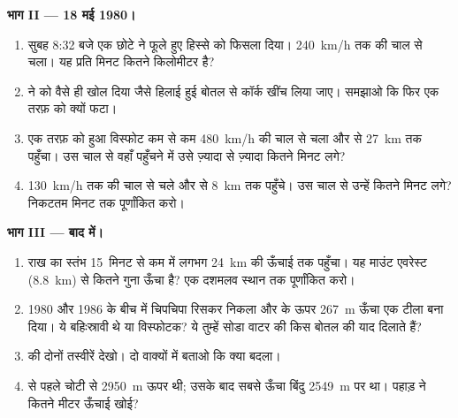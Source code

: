 \begin{problem}[{सप्ताहांत समस्या --- माउंट सेंट~हेलेंस के चेतावनी संकेत,
18~मई 1980 का उद्गार, और पहाड़ का कितना हिस्सा ग़ायब हो गया}]
\medskip
\noindent\textbf{भाग II --- 18 मई 1980।}\par\nopagebreak
\begin{enumerate}[resume, beginpenalty=10000]
  \item सुबह 8:32 बजे एक छोटे  ने फूले हुए हिस्से को फिसला दिया। 
        \qty{240}{km/h} तक की चाल से चला। यह प्रति मिनट कितने
        किलोमीटर है?
  \item {} ने  को वैसे ही खोल दिया जैसे हिलाई हुई बोतल से कॉर्क खींच
        लिया जाए। समझाओ कि फिर  एक तरफ़ को क्यों फटा।
  \item एक तरफ़ को हुआ विस्फोट कम से कम \qty{480}{km/h} की चाल से चला और
         से \qty{27}{km} तक पहुँचा। उस चाल से वहाँ पहुँचने में उसे
        ज़्यादा से ज़्यादा कितने मिनट लगे?
  \item {} \qty{130}{km/h} तक की चाल से चले और  से
        \qty{8}{km} तक पहुँचे। उस चाल से उन्हें कितने मिनट लगे? निकटतम मिनट तक
        पूर्णांकित करो।
\end{enumerate}

\medskip
\noindent\textbf{भाग III --- बाद में।}\par\nopagebreak
\begin{enumerate}[resume, beginpenalty=10000]
  \item राख का स्तंभ 15~मिनट से कम में लगभग \qty{24}{km} की ऊँचाई तक पहुँचा।
        यह माउंट एवरेस्ट (\qty{8.8}{km}) से कितने गुना ऊँचा है? एक दशमलव स्थान
        तक पूर्णांकित करो।
  \item 1980 और 1986 के बीच  में चिपचिपा  रिसकर निकला और
         के ऊपर \qty{267}{m} ऊँचा एक टीला बना दिया। ये 
        बहिःस्रावी थे या विस्फोटक? ये तुम्हें सोडा वाटर की किस बोतल की याद
        दिलाते हैं?
  \item {} की दोनों तस्वीरें देखो। दो वाक्यों में बताओ कि क्या
        बदला।
  \item {} से पहले चोटी  से \qty{2950}{m} ऊपर थी; उसके बाद सबसे
        ऊँचा बिंदु \qty{2549}{m} पर था। पहाड़ ने कितने मीटर ऊँचाई
        खोई?
\end{enumerate}
\end{problem}
